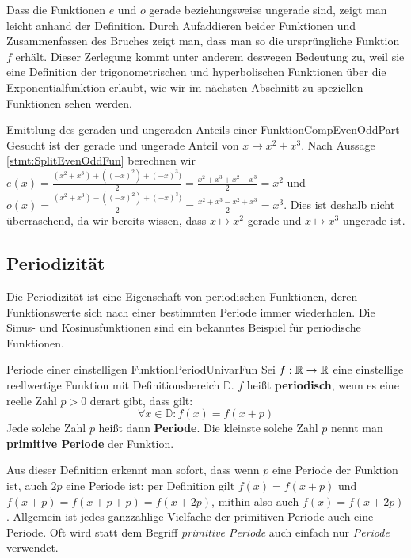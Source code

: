Dass die Funktionen $e$ und $o$ gerade beziehungsweise ungerade sind, zeigt man leicht anhand der Definition. Durch Aufaddieren beider Funktionen und Zusammenfassen des Bruches zeigt man, dass man so die ursprüngliche Funktion $f$ erhält. Dieser Zerlegung kommt unter anderem deswegen Bedeutung zu, weil sie eine Definition der trigonometrischen und hyperbolischen Funktionen über die Exponentialfunktion erlaubt, wie wir im nächsten Abschnitt zu speziellen Funktionen sehen werden.

\begin{example}{Emittlung des geraden und ungeraden Anteils einer Funktion}{CompEvenOddPart}
    Gesucht ist der gerade und ungerade Anteil von $x \mapsto x^2+x^3$. Nach Aussage \ref{stmt:SplitEvenOddFun} berechnen wir $e(x) = \frac{(x^2+x^3)+((-x)^2)+(-x)^3)}{2} = \frac{x^2+x^3+x^2-x^3}{2} = x^2$ und $o(x) = \frac{(x^2+x^3)-((-x)^2)+(-x)^3)}{2} = \frac{x^2+x^3-x^2+x^3}{2} = x^3$. Dies ist deshalb nicht überraschend, da wir bereits wissen, dass $x\mapsto x^2$ gerade und $x \mapsto x^3$ ungerade ist.
\end{example}

\subsection{Periodizität}

Die Periodizität ist eine Eigenschaft von periodischen Funktionen, deren Funktionswerte sich nach einer bestimmten Periode immer wiederholen. Die Sinus- und Kosinusfunktionen sind ein bekanntes Beispiel für periodische Funktionen.

\begin{definition}{Periode einer einstelligen Funktion}{PeriodUnivarFun}
    Sei $f: \mathbb{R} \to \mathbb{R}$ eine einstellige reellwertige Funktion mit Definitionsbereich $\mathbb{D}$. $f$ heißt \textbf{periodisch}, wenn es eine reelle Zahl $p>0$ derart gibt, dass gilt:
    $$
        \forall x \in \mathbb{D}: f(x) = f(x+p)
    $$
    Jede solche Zahl $p$ heißt dann \textbf{Periode}. Die kleinste solche Zahl $p$ nennt man \textbf{primitive Periode} der Funktion.
\end{definition}

Aus dieser Definition erkennt man sofort, dass wenn $p$ eine Periode der Funktion ist, auch $2p$ eine Periode ist: per Definition gilt $f(x) = f(x+p)$ und $f(x+p)=f(x+p+p)=f(x+2p)$, mithin also auch $f(x) = f(x+2p)$. Allgemein ist jedes ganzzahlige Vielfache der primitiven Periode auch eine Periode. Oft wird statt dem Begriff \emph{primitive Periode} auch einfach nur \emph{Periode} verwendet.


